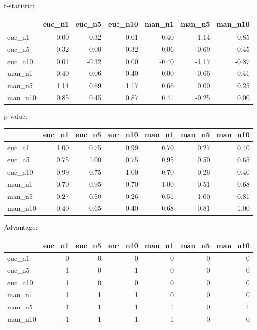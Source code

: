 t-statistic:
 \begin{tabular}{lrrrrrr}
\hline
         &   euc\_n1 &   euc\_n5 &   euc\_n10 &   man\_n1 &   man\_n5 &   man\_n10 \\
\hline
 euc\_n1  &     0.00 &    -0.32 &     -0.01 &    -0.40 &    -1.14 &     -0.85 \\
 euc\_n5  &     0.32 &     0.00 &      0.32 &    -0.06 &    -0.69 &     -0.45 \\
 euc\_n10 &     0.01 &    -0.32 &      0.00 &    -0.40 &    -1.17 &     -0.87 \\
 man\_n1  &     0.40 &     0.06 &      0.40 &     0.00 &    -0.66 &     -0.41 \\
 man\_n5  &     1.14 &     0.69 &      1.17 &     0.66 &     0.00 &      0.25 \\
 man\_n10 &     0.85 &     0.45 &      0.87 &     0.41 &    -0.25 &      0.00 \\
\hline
\end{tabular} 

p-value:
 \begin{tabular}{lrrrrrr}
\hline
         &   euc\_n1 &   euc\_n5 &   euc\_n10 &   man\_n1 &   man\_n5 &   man\_n10 \\
\hline
 euc\_n1  &     1.00 &     0.75 &      0.99 &     0.70 &     0.27 &      0.40 \\
 euc\_n5  &     0.75 &     1.00 &      0.75 &     0.95 &     0.50 &      0.65 \\
 euc\_n10 &     0.99 &     0.75 &      1.00 &     0.70 &     0.26 &      0.40 \\
 man\_n1  &     0.70 &     0.95 &      0.70 &     1.00 &     0.51 &      0.68 \\
 man\_n5  &     0.27 &     0.50 &      0.26 &     0.51 &     1.00 &      0.81 \\
 man\_n10 &     0.40 &     0.65 &      0.40 &     0.68 &     0.81 &      1.00 \\
\hline
\end{tabular} 

Advantage:
 \begin{tabular}{lrrrrrr}
\hline
         &   euc\_n1 &   euc\_n5 &   euc\_n10 &   man\_n1 &   man\_n5 &   man\_n10 \\
\hline
 euc\_n1  &        0 &        0 &         0 &        0 &        0 &         0 \\
 euc\_n5  &        1 &        0 &         1 &        0 &        0 &         0 \\
 euc\_n10 &        1 &        0 &         0 &        0 &        0 &         0 \\
 man\_n1  &        1 &        1 &         1 &        0 &        0 &         0 \\
 man\_n5  &        1 &        1 &         1 &        1 &        0 &         1 \\
 man\_n10 &        1 &        1 &         1 &        1 &        0 &         0 \\
\hline
\end{tabular} 

